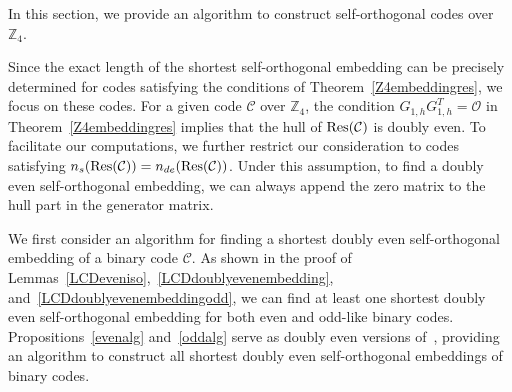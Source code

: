\documentclass{article}
\theoremstyle{definition}
\theoremstyle{remark}
\begin{document}
In this section, we provide an algorithm to construct self-orthogonal codes over $\mathbb{Z}_4$.

Since the exact length of the shortest self-orthogonal embedding can be precisely determined for codes satisfying the conditions of Theorem~\ref{Z4embeddingres}, we focus on these codes. For a given code $\mathcal{C}$ over $\mathbb{Z}_4$, the condition $G_{1, h}G_{1, h}^T=\mathcal{O}$ in Theorem~\ref{Z4embeddingres} implies that the hull of ${\rm Res}(\mathcal{C})$ is doubly even. To facilitate our computations, we further restrict our consideration to codes satisfying $n_s({\rm Res}(\mathcal{C}))=n_{de}({\rm Res}(\mathcal{C}))$. Under this assumption, to find a doubly even self-orthogonal embedding, we can always append the zero matrix to the hull part in the generator matrix. 

We first consider an algorithm for finding a shortest doubly even self-orthogonal embedding of a binary code $\mathcal{C}$. As shown in the proof of Lemmas~\ref{LCDeveniso},~\ref{LCDdoublyevenembedding}, and~\ref{LCDdoublyevenembeddingodd}, we can find at least one shortest doubly even self-orthogonal embedding for both even and odd-like binary codes. Propositions~\ref{evenalg} and~\ref{oddalg} serve as doubly even versions of~\cite[Theorem 4.2]{AHKL-arXiv}, providing an algorithm to construct all shortest doubly even self-orthogonal embeddings of binary codes.
\end{document}
